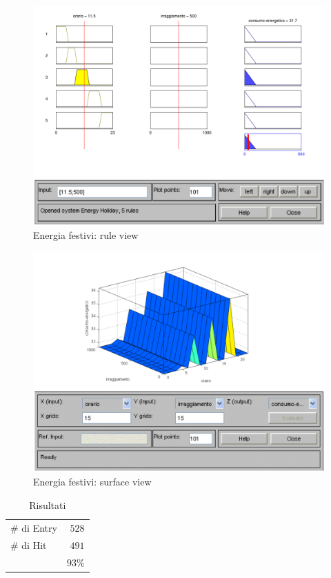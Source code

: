 \begin{figure}[htbp]
  \centering
  \includegraphics[scale=0.5]{images/fuzzy/energia_festivi_rule_view.pdf}
  \caption{Energia festivi: rule view}
\end{figure}

\begin{figure}[htbp]
  \centering
  \includegraphics[scale=0.5]{images/fuzzy/energia_festivi_surface_view.pdf}
  \caption{Energia festivi: surface view}
\end{figure}

\begin{table}
  \caption{Risultati}
  \centering
	\begin{tabular}{lr}
		\toprule
      \# di Entry & $ 528 $ \\
			\# di Hit   & $ 491 $ \\
		\midrule
			& $ 93\% $ \\
		\bottomrule
	\end{tabular}
\end{table}
